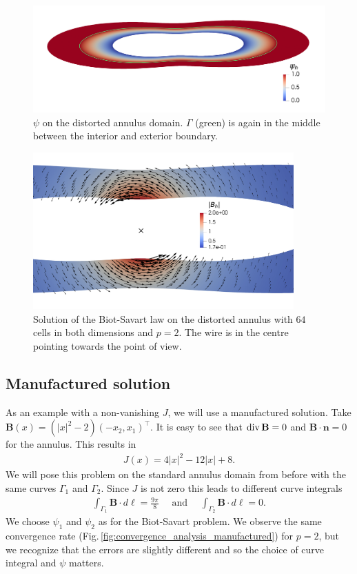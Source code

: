 \documentclass[../master_thesis.tex]{subfiles}
\begin{document}
\begin{figure}
    \centering
    \includegraphics[width=12cm]{plot_files/biot_savart_distorted/psi_h.png}
    \caption{$\psi$ on the distorted annulus domain. $\Gamma$ (green) is again 
        in the middle between the interior and exterior boundary.
    }
    \label{fig:psi_distorted_annulus}
\end{figure}
\begin{figure}
    \centering
    \includegraphics[width=10cm]{plot_files/biot_savart_distorted/B_h_with_cross.png}
    \caption{Solution of the Biot-Savart law on the distorted annulus 
    with $64$ cells in both dimensions and $p=2$. The wire 
    is in the centre pointing towards the point of view.
    }
    \label{fig:distorted_annulus_plot}
\end{figure}

\subsection{Manufactured solution}

As an example with a non-vanishing $J$, we will use a manufactured solution. 
Take $\mathbf{B}(x) = (|x|^2 -2) (-x_2,x_1)^\top$. It is easy to see that 
$\operatorname{div} \mathbf{B} = 0$ and 
$\mathbf{B}\cdot \mathbf{n} = 0$ for the annulus. 
This results in   
\begin{align*}
    J(x) = 4 |x|^2 - 12 |x| + 8.
\end{align*}
We will pose this problem on the standard annulus domain from before with the same 
curves $\Gamma_1$ and $\Gamma_2$. 
Since $J$ is not zero this leads to different curve integrals
\begin{align*}
    \int_{\Gamma_1} \mathbf{B}\cdot d\ell = \frac{9\pi}{8} \quad \text{  and  } \quad
    \int_{\Gamma_2} \mathbf{B}\cdot d\ell = 0.
\end{align*}
We choose $\psi_1$ and $\psi_2$ as for the Biot-Savart problem. We observe the same convergence rate 
(Fig.\,\ref{fig:convergence_analysis_manufactured}) for $p=2$, but we recognize that 
the errors are slightly different and so the choice of curve integral and 
$\psi$ matters. 
\end{document}
